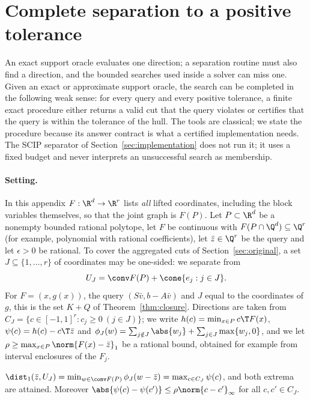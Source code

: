 \section{Complete separation to a positive tolerance}\label{app:separation}

An exact support oracle evaluates one direction; a separation routine must
also find a direction, and the bounded searches used inside a solver can miss
one. Given an exact or approximate support oracle, the search can be completed
in the following weak sense: for every query and every positive tolerance, a
finite exact procedure either returns a valid cut that the query violates or
certifies that the query is within the tolerance of the hull. The tools are
classical; we state the procedure because its answer contract is what a
certified implementation needs. The SCIP separator of
Section~\ref{sec:implementation} does not run it; it uses a fixed budget and
never interprets an unsuccessful search as membership.

\paragraph{Setting.}
In this appendix $F:\R^d\to\R^r$ lists \emph{all} lifted coordinates,
including the block variables themselves, so that the joint graph is $F(P)$.
Let $P\subset\R^d$ be a nonempty bounded rational polytope, let $F$ be
continuous with $F(P\cap\Q^d)\subseteq\Q^r$ (for example, polynomial with
rational coefficients), let $\bar z\in\Q^r$ be the query and let $\epsilon>0$ be
rational. To cover the aggregated cuts of Section~\ref{sec:original}, a set
$J\subseteq\{1,\dots,r\}$ of coordinates may be one-sided: we separate from
\[
U_J=\conv F(P)+\cone\{e_j:j\in J\}.
\]
For $F=(x,g(x))$, the query $(S\bar v,b-A\bar v)$ and $J$ equal to the coordinates
of $g$, this is the set $K+Q$ of Theorem~\ref{thm:closure}. Directions are taken
from $C_J=\{c\in[-1,1]^r:c_j\ge0\ (j\in J)\}$; we write
$h(c)=\min_{x\in P}c\T F(x)$, $\psi(c)=h(c)-c\T\bar z$ and
$\phi_J(w)=\sum_{j\notin J}\abs{w_j}+\sum_{j\in J}\max\{w_j,0\}$, and we let
$\rho\ge\max_{x\in P}\norm{F(x)-\bar z}_1$ be a rational bound, obtained for
example from interval enclosures of the $F_j$.

\begin{lemma}\label{lem:distance}
$\dist_1(\bar z,U_J)=\min_{w\in\conv F(P)}\phi_J(w-\bar z)=\max_{c\in C_J}\psi(c)$,
and both extrema are attained. Moreover
$\abs{\psi(c)-\psi(c')}\le\rho\norm{c-c'}_\infty$ for all $c,c'\in C_J$.
\end{lemma}

